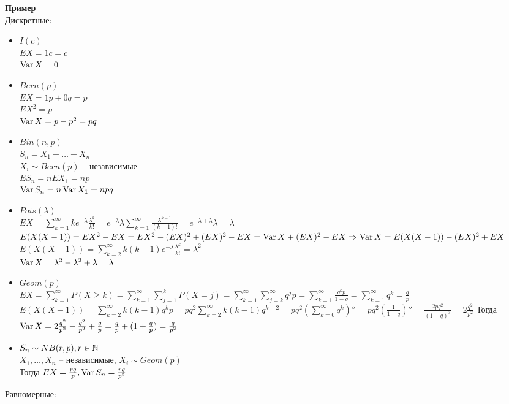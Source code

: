 \documentclass[12pt]{article}
\begin{document}
\textbf{Пример}\\
Дискретные:
\begin{itemize}
    \item $I(c)$\\
    $EX = 1c = c$\\
    $\operatorname{Var} X = 0$
    \item $Bern(p)$\\
    $EX = 1p + 0q = p$\\
    $EX^2 = p$\\
    $\operatorname{Var} X = p - p^2 = pq$
    \item $Bin(n, p)$\\
    $S_n = X_1 + \ldots + X_n$\\
    $X_i \sim Bern(p)$ -- независимые\\
    $ES_n = nEX_1 = np$\\
    $\operatorname{Var} S_n = n\operatorname{Var} X_1 = npq$
    \item $Pois(\lambda)$\\
    $EX = \sum_{k=1}^\infty ke^{-\lambda}\frac{\lambda^k}{k!} = e^{-\lambda}\lambda \sum_{k=1}^\infty \frac{\lambda^{k-1}}{(k-1)!} = e^{-\lambda+\lambda}\lambda = \lambda$\\
    $E(X(X-1)) = EX^2 - EX = EX^2 - (EX)^2  + (EX)^2 - EX = \operatorname{Var} X + (EX)^2 - EX \Rightarrow \operatorname{Var} X = E(X(X-1)) - (EX)^2 + EX$\\
    $E(X(X-1))=\sum_{k=2}^\infty k(k-1)e^{-\lambda}\frac{\lambda^k}{k!} = \lambda^2$\\
    $\operatorname{Var} X = \lambda^2 - \lambda^2 + \lambda = \lambda$
    \item $Geom(p)$\\
    $EX = \sum_{k=1}^\infty P(X\geq k) = \sum_{k=1}^\infty \sum_{j=1}^k P(X=j) = \sum_{k=1}^\infty \sum_{j=k}^\infty q^jp= \sum_{k=1}^\infty \frac{q^k p}{1-q} = \sum_{k=1}^\infty q^k = \frac qp$\\
    $E(X(X-1)) = \sum_{k=2}^\infty k(k-1)q^kp = pq^2\sum_{k=2}^\infty k(k-1)q^{k-2} = pq^2 (\sum_{k=0}^\infty q^k)'' = pq^2 (\frac1{1-q})'' = \frac{2pq^2}{(1-q)^3} = 2\frac{q^2}{p^2}$
    Тогда $\operatorname{Var} X = 2\frac{q^2}{p^2} - \frac{q^2}{p^2} + \frac qp = \frac qp + (1 + \frac qp) = \frac{q}{p^2}$
    \item $S_n \sim NB(r, p), r \in \mathbb{N}$\\
    $X_1, \ldots, X_n$ -- независимые, $X_i \sim Geom(p)$\\
    Тогда $EX = \frac{rq}{p}, \operatorname{Var} S_n = \frac{rq}{p^2}$
\end{itemize}
Равномерные:
\end{document}
